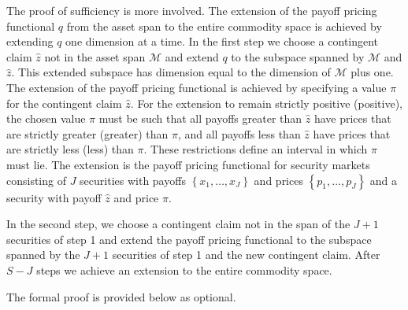 \documentclass[\topdir/lecture\_notes.tex]{subfiles}
\begin{document}
The proof of sufficiency is more involved. The extension of the payoff pricing functional \(q\) from the asset span to the entire commodity space is achieved by extending \(q\) one dimension at a time. In the first step we choose a contingent claim \(\hat{z}\) not in the asset span \(\mathcal{M}\) and extend \(q\) to the subspace spanned by \(\mathcal{M}\) and \(\hat{z}\). This extended subspace has dimension equal to the dimension of \(\mathcal{M}\) plus one. The extension of the payoff pricing functional is achieved by specifying a value \(\pi\) for the contingent claim \(\hat{z}\). For the extension to remain strictly positive (positive), the chosen value \(\pi\) must be such that all payoffs greater than \(\hat{z}\) have prices that are strictly greater (greater) than \(\pi\), and all payoffs less than \(\hat{z}\) have prices that are strictly less (less) than \(\pi\). These restrictions define an interval in which \(\pi\) must lie. The extension is the payoff pricing functional for security markets consisting of \(J\) securities with payoffs \(\left\{x_{1}, \ldots, x_{J}\right\}\) and prices \(\left\{p_{1}, \ldots, p_{J}\right\}\) and a security with payoff \(\hat{z}\) and price \(\pi\).

In the second step, we choose a contingent claim not in the span of the \(J+1\) securities of step 1 and extend the payoff pricing functional to the subspace spanned by the \(J+1\) securities of step 1 and the new contingent claim. After \(S-J\) steps we achieve an extension to the entire commodity space.

The formal proof is provided below as optional.
\end{document}
